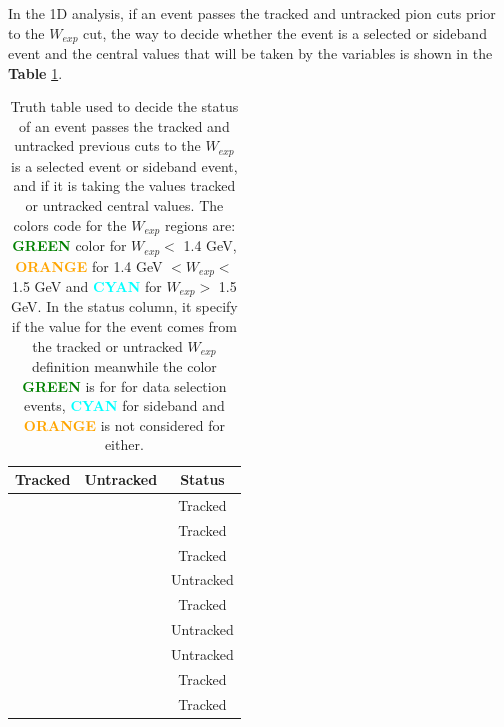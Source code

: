 In the 1D analysis, if an event passes the tracked and untracked pion cuts prior to the $W_{exp}$ cut, the way to decide whether the event is a selected or sideband event and the central values that will be taken by the variables is shown in the \textbf{Table} \ref{tab:Analysis:BgStudies:SidebandTunning:WTruthTable}.


\begin{table}[!htb]
	
	\centering

	\begin{tabular}{c|c|c}
        Tracked           & Untracked         & Status \\ \hline
		\cellcolor{green} & \cellcolor{green} & \cellcolor{green} Tracked \\ \hline
		\cellcolor{green} & \cellcolor{orange} & \cellcolor{green} Tracked\\ \hline
  		\cellcolor{green} & \cellcolor{cyan} & \cellcolor{green} Tracked\\ \hline
		\cellcolor{orange} & \cellcolor{green} & \cellcolor{green} Untracked\\ \hline
  		\cellcolor{orange} & \cellcolor{orange} & \cellcolor{orange} Tracked\\ \hline
		\cellcolor{orange} & \cellcolor{cyan} & \cellcolor{cyan} Untracked\\ \hline
  		\cellcolor{cyan} & \cellcolor{green} & \cellcolor{green} Untracked\\ \hline
		\cellcolor{cyan} & \cellcolor{orange} & \cellcolor{cyan} Tracked\\ \hline
  		\cellcolor{cyan} & \cellcolor{cyan} & \cellcolor{cyan} Tracked\\ \hline
	\end{tabular}

    \caption{Truth table used to decide the status of an event passes the tracked and untracked previous cuts to the $W_{exp}$ is a selected event or sideband event, and if it is taking the values tracked or untracked central values. The colors code for the $W_{exp}$ regions are: \textbf{\textcolor{green}{GREEN}} color for $W_{exp}<$ 1.4 GeV, \textbf{\textcolor{orange}{ORANGE}} for 1.4 GeV $<W_{exp}<$ 1.5 GeV and \textbf{\textcolor{cyan}{ CYAN}} for $W_{exp}>$ 1.5 GeV. In the status column, it specify if the value for the event comes from the tracked or untracked $W_{exp}$ definition meanwhile the color \textbf{\textcolor{green}{GREEN}} is for for data selection events, \textbf{\textcolor{cyan}{CYAN}} for sideband and \textbf{\textcolor{orange}{ORANGE}} is not considered for either.}
	\label{tab:Analysis:BgStudies:SidebandTunning:WTruthTable}
\end{table}

